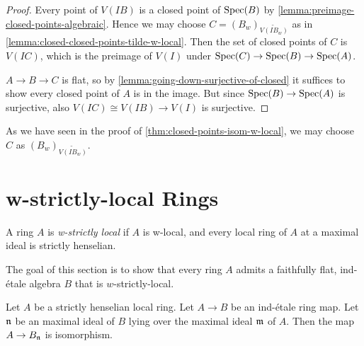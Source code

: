 \begin{proof}
    Every point of $V(IB)$ is a closed point of $\mathrm{Spec}(B)$ by \ref{lemma:preimage-closed-points-algebraic}.
    Hence we may choose $C = (B_w)_{\widetilde{V(IB_w)}}$ as in \ref{lemma:closed-closed-points-tilde-w-local}. Then
    the set of closed points of $C$ is $V(IC)$, which is the preimage of $V(I)$ under
    $\mathrm{Spec}(C) \to \mathrm{Spec}(B) \to \mathrm{Spec}(A)$.

    $A \to B \to C$ is flat, so by \ref{lemma:going-down-surjective-of-closed} it suffices
    to show every closed point of $A$ is in the image. But since $\mathrm{Spec}(B) \to \mathrm{Spec}(A)$ is surjective,
    also $V(IC) \cong V(IB) \to V(I)$ is surjective.
\end{proof}

\begin{remark}
    As we have seen in the proof of \ref{thm:closed-points-isom-w-local}, we may choose
    $C$ as $(B_w)_{\widetilde{V(IB_w)}}$.
\end{remark}

\section{w-strictly-local Rings}

\begin{definition}
    A ring \(A\) is \emph{w-strictly local} if \(A\) is w-local, and every local ring of \(A\) at a
    maximal ideal is strictly henselian.
    \label{def:w-strictly-local-ring}
    \leanok
\end{definition}

The goal of this section is to show that every ring $A$ admits a faithfully flat, ind-étale algebra $B$ that is $w$-strictly-local.

\begin{lemma}
  \label{thm:ind-etale-strictly-henselian-localization-isom}
  Let \(A\) be a strictly henselian local ring. Let \(A \to B\) be an ind-étale ring map.
  Let ${\mathfrak{n}}$ be an maximal ideal of $B$ lying over the maximal ideal ${\mathfrak{m}}$ of $A$.
  Then the map $A \to B_{\mathfrak{n}}$ is isomorphism.
\end{lemma}

